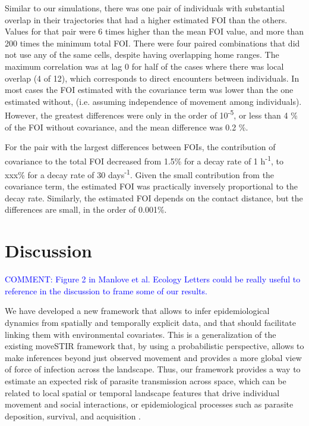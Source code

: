 \documentclass[letterpaper]{article}
\begin{document}
Similar to our simulations, there was one pair of individuals with substantial overlap in their trajectories that had a higher estimated FOI than the others. Values for that pair were 6 times higher than the mean FOI value, and more than 200 times the minimum total FOI. 
There were four paired combinations that did not use any of the same cells, despite having overlapping home ranges. %
The maximum correlation was at lag 0 for half of the cases where there was local overlap (4 of 12), which corresponds to direct encounters between individuals.
In most cases the FOI estimated with the covariance term was lower than the one estimated without, (i.e. assuming independence of movement among individuals). However, the greatest differences were only in the order of 10\textsuperscript{-5}, or less than 4 \% of the FOI without covariance, and the mean difference was 0.2 \%.


For the pair with the largest differences between FOIs, the contribution of covariance to the total FOI decreased from 1.5\% for a decay rate of 1 h\textsuperscript{-1}, to xxx\% for a decay rate of 30 days\textsuperscript{-1}.
Given the small contribution from the covariance term, the estimated FOI was practically inversely proportional to the decay rate. 
Similarly, the estimated FOI depends on the contact distance, but the differences are small, in the order of 0.001\%. 


\section*{Discussion}

\textcolor{blue}{COMMENT: Figure 2 in Manlove et al. Ecology Letters could be really useful to reference in the discussion to frame some of our results.}

We have developed a new framework that allows to infer epidemiological dynamics from spatially and temporally explicit data, and that should facilitate linking them with environmental covariates. This is a generalization of the existing moveSTIR framework \citep{Wilber2022} that, by using a probabilistic perspective, allows to make inferences beyond just observed movement and provides a more global view of force of infection across the landscape. 
Thus, our framework provides a way to estimate an expected risk of parasite transmission across space, which can be related to local spatial or temporal landscape features that drive individual movement and social interactions, or epidemiological processes such as parasite deposition, survival, and acquisition \citep{Merkle2018,VanderWaal2017}. 
\end{document}
